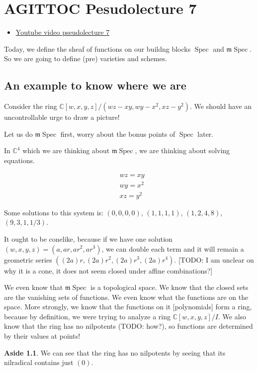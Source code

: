 \documentclass{book}
\newcommand{\C}{\ensuremath{\mathbb{C}}}
\newcommand{\Spec}{\operatorname{Spec}}
\newcommand{\m}{\mathfrak{m}}
\newcommand{\mSpec}{\m\operatorname{Spec}}
\theoremstyle{definition}
\newtheorem{aside}[theorem]{Aside}
\begin{document}
\chapter{AGITTOC  Pesudolecture 7}
\begin{itemize}
\item \href{https://www.youtube.com/watch?v=4KJwmiYHVk4}{Youtube video pseudolecture 7}
\end{itemize}

Today, we define the sheaf of functions on our buildng blocks $\Spec$ and $\mSpec$.
So we are going to define (pre) varieties and schemes.

\section{An example to know where we are}
Consider the ring $\C[w, x, y, z]/(wz - xy, wy - x^2, xz - y^2)$. We should
have an uncontrollable urge to draw a picture! 

Let us do $\mSpec$ first, worry about the bonus points of $\Spec$ later.

In $\C^4$ which we are thinking about $\mSpec$, we are thinking about
solving equations.

\begin{align*}
&wz = xy \\
&wy = x^2 \\
&xz = y^2
\end{align*}

Some solutions to this system is:
$(0, 0, 0, 0)$, $(1, 1, 1, 1)$, $(1, 2, 4, 8)$, $(9, 3, 1, 1/3)$.

It ought to be conelike, because if we have one solution $(w, x, y, z) = (a, ar, ar^2, ar^3)$, 
we can double each term and it will remain a geometric series $((2a)r, (2a)r^2, (2a)r^3, (2a)r^4)$.
[TODO: I am unclear on why it is a cone, it does not seem closed under affine combinations?]


We even know that $\mSpec$ is a topological space. We know that the closed sets
are the vanishing sets of functions. We even know what the functions are on
the space. More strongly, we know that the functions on it [polynomials]
form a ring, because by definition, we were trying to analyze a ring
$\C[w, x, y, z]/I$. We also know that the ring has no nilpotents (TODO: how?),
so functions are determined by their values at points!                                                    

\begin{aside}
We can see that the ring has no nilpotents by seeing that its nilradical
contains just $(0)$.
\end{aside}
\end{document}
